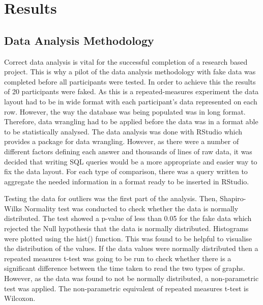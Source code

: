 \documentclass{l4proj}
\begin{document}
\section{Results}

\subsection{Data Analysis Methodology}

Correct data analysis is vital for the successful completion of a research based project. This is why a pilot of the data analysis methodology with fake data was completed before all participants were tested. In order to achieve this the results of 20 participants were faked. As this is a repeated-measures experiment the data layout had to be in wide format with each participant's data represented on each row. However, the way the database was being populated was in long format. Therefore, data wrangling had to be applied before the data was in a format able to be statistically analysed. The data analysis was done with RStudio which provides a package for data wrangling. However, as there were a number of different factors defining each answer and thousands of lines of raw data, it was decided that writing SQL queries would be a more appropriate and easier way to fix the data layout. For each type of comparison, there was a query written to aggregate the needed information in a format ready to be inserted in RStudio. 

Testing the data for outliers was the first part of the analysis. Then, Shapiro-Wilks Normality test was conducted to check whether the data is normally distributed. The test showed a p-value of less than 0.05 for the fake data which rejected the Null hypothesis that the data is normally distributed. Histograms were plotted using the hist() function. This was found to be helpful to visualise the distribution of the values. If the data values were normally distributed then a repeated measures t-test was going to be run to check whether there is a significant difference between the time taken to read the two types of graphs. However, as the data was found to not be normally distributed, a non-parametric test was applied. The non-parametric equivalent of repeated measures t-test is Wilcoxon. 
\end{document}
